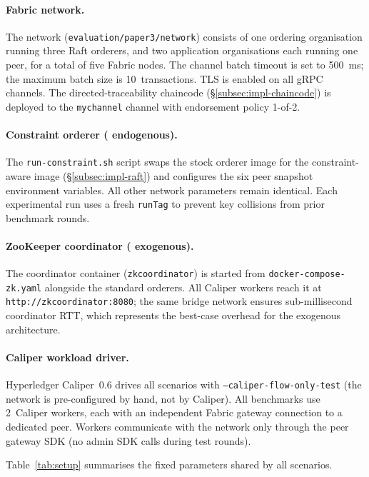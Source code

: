 \paragraph{Fabric network.}
The network (\texttt{evaluation/paper3/network}) consists of one ordering
organisation running three Raft orderers, and two application organisations each
running one peer, for a total of five Fabric nodes.  The channel batch timeout
is set to 500~ms; the maximum batch size is 10~transactions.  TLS is enabled on
all gRPC channels.  The directed-traceability chaincode
(\S\ref{subsec:impl-chaincode}) is deployed to the \texttt{mychannel} channel
with endorsement policy 1-of-2.

\paragraph{Constraint orderer ( endogenous).}
The \texttt{run-constraint.sh} script swaps the stock orderer image for the
constraint-aware image (\S\ref{subsec:impl-raft}) and configures the six peer
snapshot environment variables.  All other network parameters remain identical.
Each experimental run uses a fresh \texttt{runTag} to prevent key collisions
from prior benchmark rounds.

\paragraph{ZooKeeper coordinator ( exogenous).}
The coordinator container (\texttt{zkcoordinator}) is started from
\texttt{docker-compose-zk.yaml} alongside the standard orderers.  All Caliper
workers reach it at \texttt{http://zkcoordinator:8080}; the same bridge network
ensures sub-millisecond coordinator RTT, which represents the best-case overhead
for the exogenous architecture.

\paragraph{Caliper workload driver.}
Hyperledger Caliper~0.6 drives all scenarios with \texttt{--caliper-flow-only-test}
(the network is pre-configured by hand, not by Caliper).  All benchmarks use
2~Caliper workers, each with an independent Fabric gateway connection to a
dedicated peer.  Workers communicate with the network only through the peer
gateway SDK (no admin SDK calls during test rounds).

Table~\ref{tab:setup} summarises the fixed parameters shared by all scenarios.


